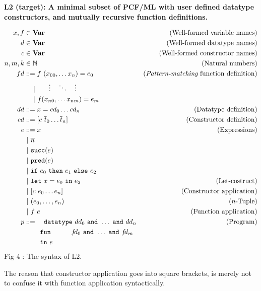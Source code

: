 \newpage
{\bf L2 (target): A minimal subset of PCF/ML with user defined datatype constructors, and mutually recursive function definitions.}
\vspace {-1.1cm}
\begin{center}
\begin{align*}
x, f    &\in \text{\bf Var}                         & \text{(Well-formed variable names)}\\
d       &\in \text{\bf Var}                         & \text{(Well-formed datatype names)}\\
c       &\in \text{\bf Var}                         & \text{(Well-formed constructor names)}\\
n, m, k &\in \mathbb N                           & \text{(Natural numbers)}\\
fd      &::= f\ (x_{00}, \dots x_n) = e_{0}  & \text{({\it Pattern-matching} function definition)}\\
        &\quad \ |\  \ \ \quad \vdots \quad \ddots \quad \vdots\\
        &\quad\ |\  f (x_{n0}, \dots x_{nm}) = e_{m}\\
dd      &::= x = cd_0 \dots cd_n          & \text{(Datatype definition)}\\
cd      &::= [c\ \overline t_{0} \dots \overline t_{n}]
                                          & \text{(Constructor definition)}\\
e      &::= x                             & \text{(Expressions)}\\
       &\ |\  \overline n\\
       &\ |\  \text{\tt succ}(e)\\
       &\ |\  \text{\tt pred}(e)\\
       &\ |\  \text{\tt if}\ e_0\ \text{\tt then}\ e_1\ \text{\tt else}\ e_2\\
       &\ |\  \text{\tt let}\ x = e_0 \ \text{\tt in}\  e_2 &\text{(Let-costruct)}\\
       &\ |\  [c\ e_0 \dots e_n]               &\text{(Constructor application)}\\
       &\ |\  (e_0,\dots ,e_n)                 &\text{($n$-Tuple)}\\
       &\ |\  f\ e                             &\text{(Function application)}\\
p      &::=\quad \text{\tt datatype}\ dd_0 \ \text{\tt and}\  \dots \ \text{\tt and}\  dd_n
       & \text{(Program)}\\
       &   \quad\quad\ \text{\tt fun}\qquad\quad f\!d_0 \ \text{\tt and}\ \dots\ \text{\tt and}\  f\!d_m\\
       &   \quad\quad\ \text{\tt in}\ e
\end{align*}
        Fig 4 : The syntax of L2.
\end{center}
The reason that constructor application goes into square brackets,
is merely not to confuse it with function application syntactically.

